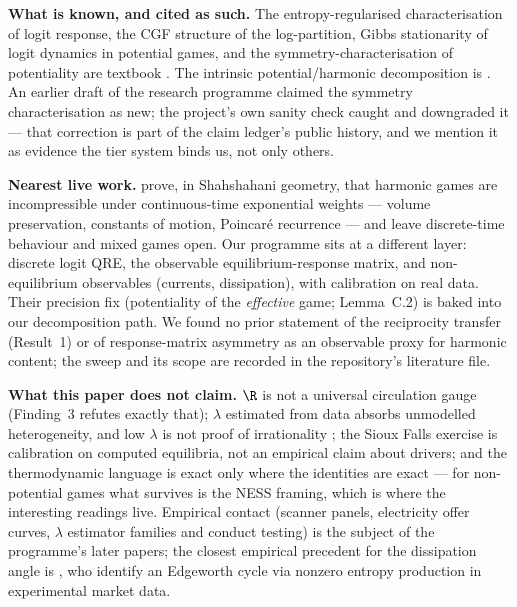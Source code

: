 \textbf{What is known, and cited as such.} The entropy-regularised
characterisation of logit response, the CGF structure of the log-partition,
Gibbs stationarity of logit dynamics in potential games, and the
symmetry-characterisation of potentiality are textbook
\citep{mckelvey1995,blume1993,monderer1996,sandholm2010,balduzzi2018,matejka2015}.
The intrinsic potential/harmonic decomposition is \citet{candogan2011}. An
earlier draft of the research programme claimed the symmetry characterisation
as new; the project's own sanity check caught and downgraded it --- that
correction is part of the claim ledger's public history, and we mention it as
evidence the tier system binds us, not only others.

\textbf{Nearest live work.} \citet{legacci2024} prove, in Shahshahani geometry,
that harmonic games are incompressible under continuous-time exponential
weights --- volume preservation, constants of motion, Poincar\'e recurrence ---
and leave discrete-time behaviour and mixed games open. Our programme sits at
a different layer: discrete logit QRE, the observable equilibrium-response
matrix, and non-equilibrium observables (currents, dissipation), with
calibration on real data. Their precision fix (potentiality of the
\emph{effective} game; Lemma~C.2) is baked into our decomposition path. We
found no prior statement of the reciprocity transfer (Result~1) or of
response-matrix asymmetry as an observable proxy for harmonic content; the
sweep and its scope are recorded in the repository's literature file.

\textbf{What this paper does not claim.} $\R$ is not a universal circulation
gauge (Finding~3 refutes exactly that); $\lambda$ estimated from data absorbs
unmodelled heterogeneity, and low $\lambda$ is not proof of irrationality
\citep{hhk2008}; the Sioux Falls exercise is calibration on computed
equilibria, not an empirical claim about drivers; and the thermodynamic
language is exact only where the identities are exact --- for non-potential
games what survives is the NESS framing, which is where the interesting
readings live. Empirical contact (scanner panels, electricity offer curves,
$\lambda$ estimator families and conduct testing) is the subject of the
programme's later papers; the closest empirical precedent for the dissipation
angle is \citet{xu2011}, who identify an Edgeworth cycle via nonzero entropy
production in experimental market data.
